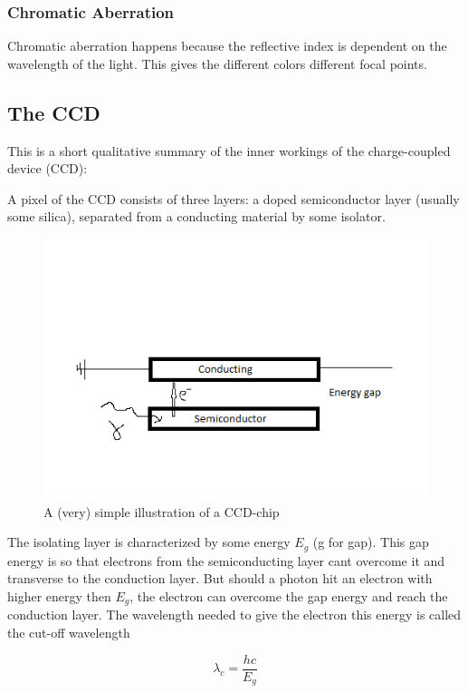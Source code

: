 \documentclass{emulateapj}
\begin{document}
\subsubsection{Chromatic Aberration}
\label{sec:chromAb}
Chromatic aberration happens because the reflective index is dependent on the wavelength of the light. This gives the different colors different focal points.


\subsection{The CCD}
\label{sec:ccd}
This is a short qualitative summary of the inner workings of the charge-coupled device (CCD):

A pixel of the CCD consists of three layers: a doped semiconductor layer (usually some silica), separated from a conducting material by some isolator. 

\begin{figure}[H]
\centering
\includegraphics[scale=0.4]{ccd.png}
\caption{A (very) simple illustration of a CCD-chip}
\end{figure}


The isolating layer is characterized by some energy $E_g$ (g for gap). This gap energy is so that electrons from the semiconducting layer cant overcome it and transverse to the conduction layer. But should a photon hit an electron with higher energy then $E_g$, the electron can overcome the gap energy and reach the conduction layer. The wavelength needed to give the electron this energy is called the cut-off wavelength

\begin{equation}
\lambda_{c} = \frac{hc}{E_g}
\end{equation}
\end{document}
